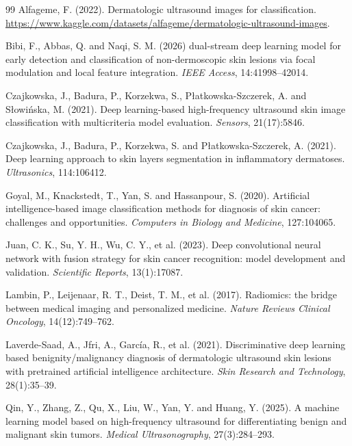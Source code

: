 \documentclass[12pt]{article}
\begin{document}
\begin{thebibliography}{99}
\setlength{\leftmargin}{0.5cm}
\setlength{\itemindent}{-0.5cm}
\setlength{\itemsep}{6pt}
\setlength{\parsep}{0pt}
 Alfageme, F. (2022). Dermatologic ultrasound images for classification. \url{https://www.kaggle.com/datasets/alfageme/dermatologic-ultrasound-images}.

 Bibi, F., Abbas, Q. and Naqi, S. M. (2026) dual-stream deep learning model for early detection and classification of non-dermoscopic skin lesions via focal modulation and local feature integration. \textit{IEEE Access}, 14:41998--42014.

 Czajkowska, J., Badura, P., Korzekwa, S., P{\l}atkowska-Szczerek, A. and S{\l}owi{\'n}ska, M. (2021). Deep learning-based high-frequency ultrasound skin image classification with multicriteria model evaluation. \textit{Sensors}, 21(17):5846.

 Czajkowska, J., Badura, P., Korzekwa, S. and P{\l}atkowska-Szczerek, A. (2021). Deep learning approach to skin layers segmentation in inflammatory dermatoses. \textit{Ultrasonics}, 114:106412.

 Goyal, M., Knackstedt, T., Yan, S. and Hassanpour, S. (2020). Artificial intelligence-based image classification methods for diagnosis of skin cancer: challenges and opportunities. \textit{Computers in Biology and Medicine}, 127:104065.

 Juan, C. K., Su, Y. H., Wu, C. Y., et al. (2023). Deep convolutional neural network with fusion strategy for skin cancer recognition: model development and validation. \textit{Scientific Reports}, 13(1):17087.

 Lambin, P., Leijenaar, R. T., Deist, T. M., et al. (2017). Radiomics: the bridge between medical imaging and personalized medicine. \textit{Nature Reviews Clinical Oncology}, 14(12):749--762.

 Laverde-Saad, A., Jfri, A., Garc\'ia, R., et al. (2021). Discriminative deep learning based benignity/malignancy diagnosis of dermatologic ultrasound skin lesions with pretrained artificial intelligence architecture. \textit{Skin Research and Technology}, 28(1):35--39.

 Qin, Y., Zhang, Z., Qu, X., Liu, W., Yan, Y. and Huang, Y. (2025). A machine learning model based on high-frequency ultrasound for differentiating benign and malignant skin tumors. \textit{Medical Ultrasonography}, 27(3):284--293.


\end{thebibliography}
\end{document}
